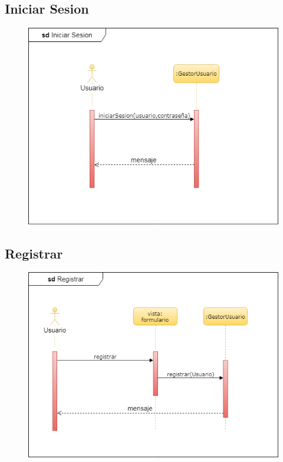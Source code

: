 		\subsection{Iniciar Sesion}
			\begin{figure}[H]
				\centering
				\includegraphics[width=1\textwidth]{imagenes/DiagramasUML/sdIniciarSesion.png}
					\label{fig:diagrama-secuencia-autenticar}
			\end{figure}

		\subsection{Registrar}
			\begin{figure}[H]
				\centering
				\includegraphics[width=1\textwidth]{imagenes/DiagramasUML/sdRegistrar.png}
					\label{fig:diagrama-secuencia-registrar}
			\end{figure}


